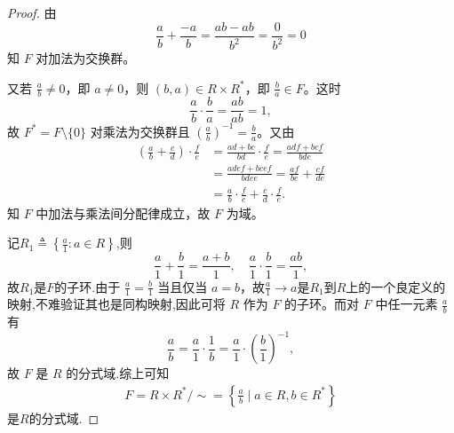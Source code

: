 \documentclass[../../main.tex]{subfiles}%
\begin{document}
\begin{proof}
由
\[
\frac{a}{b} + \frac{-a}{b} = \frac{ab - ab}{b^2} = \frac{0}{b^2} = 0
\]
知 \( F \) 对加法为交换群。

又若 \( \frac{a}{b} \neq 0 \)，即 \( a \neq 0 \)，则 \( (b, a) \in R \times R^* \)，即 \( \frac{b}{a} \in F \)。这时
\[
\frac{a}{b} \cdot \frac{b}{a} = \frac{ab}{ab} = 1,
\]
故 \( F^* = F \setminus \{0\} \) 对乘法为交换群且 \( \left( \frac{a}{b} \right)^{-1} = \frac{b}{a} \)。又由
\begin{align*}
\left( \frac{a}{b} + \frac{c}{d} \right) \cdot \frac{f}{e} &= \frac{ad + bc}{bd} \cdot \frac{f}{e} = \frac{adf + bcf}{bde} \\
&= \frac{adef + bcef}{bdee} = \frac{af}{be} + \frac{cf}{de} \\
&= \frac{a}{b} \cdot \frac{f}{e} + \frac{c}{d} \cdot \frac{f}{e}.
\end{align*}
知 \( F \) 中加法与乘法间分配律成立，故 \( F \) 为域。

记$R_1 \triangleq \left\{ \frac{a}{1}:a\in R \right\} $,则
\[
\frac{a}{1} + \frac{b}{1} = \frac{a + b}{1}, \quad \frac{a}{1} \cdot \frac{b}{1} = \frac{ab}{1},
\]
故$R_1$是$F$的子环.由于 \( \frac{a}{1} = \frac{b}{1} \) 当且仅当 \( a = b \)，故$\frac{a}{1}\to a$是$R_1$到$R$上的一个良定义的映射,不难验证其也是同构映射,因此可将 \( R \) 作为 \( F \) 的子环。而对 \( F \) 中任一元素 \( \frac{a}{b} \) 有
\[
\frac{a}{b} = \frac{a}{1} \cdot \frac{1}{b} = \frac{a}{1} \cdot \left( \frac{b}{1} \right)^{-1},
\]
故 \( F \) 是 \( R \) 的分式域.综上可知
\begin{align*}
F=R\times R^*/\sim =\left\{ \frac{a}{b}\mid a\in R,b\in R^* \right\} 
\end{align*}
是$R$的分式域.

\end{proof}
\end{document}
